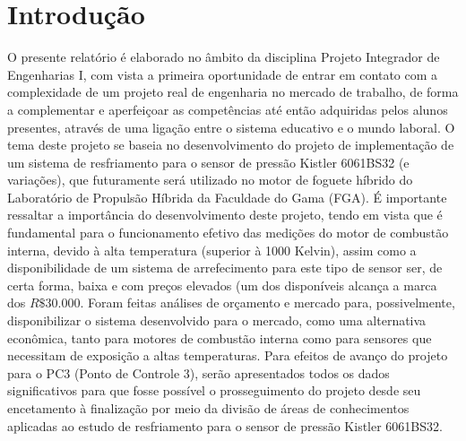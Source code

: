 \chapter{Introdução}
O presente relatório é elaborado no âmbito da disciplina Projeto Integrador de Engenharias I, com vista a primeira oportunidade de entrar em contato com a complexidade de um projeto real de engenharia no mercado de trabalho, de forma a complementar e aperfeiçoar as competências até então adquiridas pelos alunos presentes, através de uma ligação entre o sistema educativo e o mundo laboral. O tema deste projeto se baseia no desenvolvimento do projeto de implementação de um sistema de resfriamento para o sensor de pressão Kistler 6061BS32 (e variações), que futuramente será utilizado no motor de foguete híbrido do Laboratório de Propulsão Híbrida da Faculdade do Gama (FGA). É importante ressaltar a importância do desenvolvimento deste projeto, tendo em vista que é fundamental para o funcionamento efetivo das medições do motor de combustão interna, devido à alta temperatura (superior à 1000 Kelvin), assim como a disponibilidade de um sistema de arrefecimento para este tipo de sensor ser, de certa forma, baixa e com preços elevados (um dos disponíveis alcança a marca dos $R\$30.000$. Foram feitas análises de orçamento e mercado para, possivelmente, disponibilizar o sistema desenvolvido para o mercado, como uma alternativa econômica, tanto para motores de combustão interna como para sensores que necessitam de exposição a altas temperaturas. Para efeitos de avanço do projeto para o PC3 (Ponto de Controle 3), serão apresentados todos os dados significativos para que fosse possível o prosseguimento do projeto desde seu encetamento à finalização por meio da divisão de áreas de conhecimentos aplicadas ao estudo de resfriamento para o sensor de pressão Kistler 6061BS32. 
